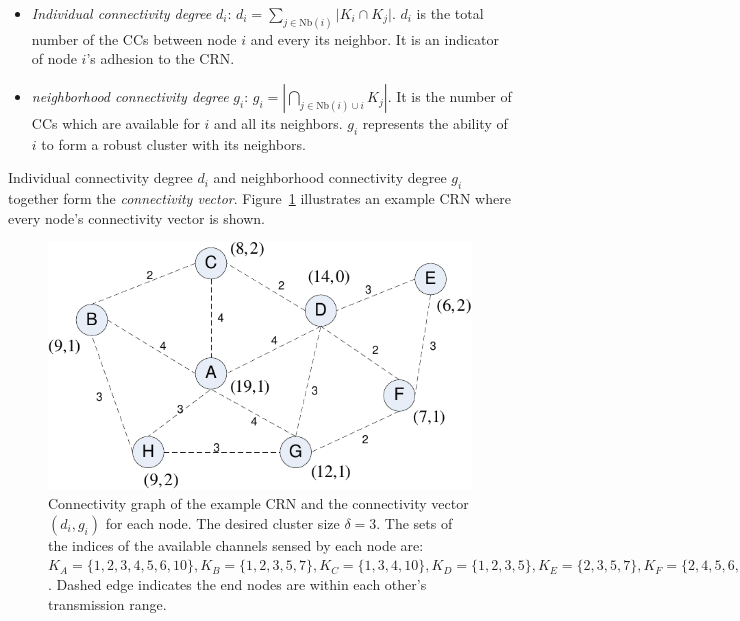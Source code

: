 \documentclass[10pt,journal,compsoc]{IEEEtran}
\theoremstyle{mytheoremstyle}
\theoremstyle{mytheoremstyle}
\theoremstyle{mytheoremstyle}
\begin{document}
\begin{itemize}

\item \textit{Individual connectivity degree} $d_i$: $d_i=\sum_{j\in \text{Nb}(i)}\vert K_i\cap K_j\vert$. 
$d_i$ is the total number of the CCs between node $i$ and every its neighbor.
It is an indicator of node $i$'s adhesion to the CRN. 

\item \textit{neighborhood connectivity degree} $g_i$: $g_i=|\bigcap_{j\in \text{Nb}(i)\cup i}K_j|$. 
It is the number of CCs which are available for $i$ and all its neighbors.
$g_i$ represents the ability of $i$ to form a robust cluster with its neighbors.
\end{itemize}
Individual connectivity degree $d_i$ and neighborhood connectivity degree $g_i$ together form the \textit{connectivity vector}.
Figure~\ref{fig1} illustrates an example CRN where every node's connectivity vector is shown.	
\begin{figure}[ht!]
  \centering
\includegraphics[width=0.7\linewidth]{figure1.pdf}
	\caption{Connectivity graph of the example CRN and the connectivity vector $(d_i, g_i)$ for each node. The desired cluster size $\delta =3$. The sets of the indices of the available channels sensed by each node are: $K_A=\{1,2,3,4,5,6,10\}, K_B=\{1,2,3,5,7\}, K_C=\{1,3,4,10\}, K_D=\{1,2,3,5\}, K_E=\{2,3,5,7\}, K_F=\{2,4,5,6,7\}, K_G=\{1,2,3,4,8\}, K_H=\{1,2,5,8\}$. Dashed edge indicates the end nodes are within each other's transmission range.}
	\label{fig1}
\end{figure}

	
\end{document}
